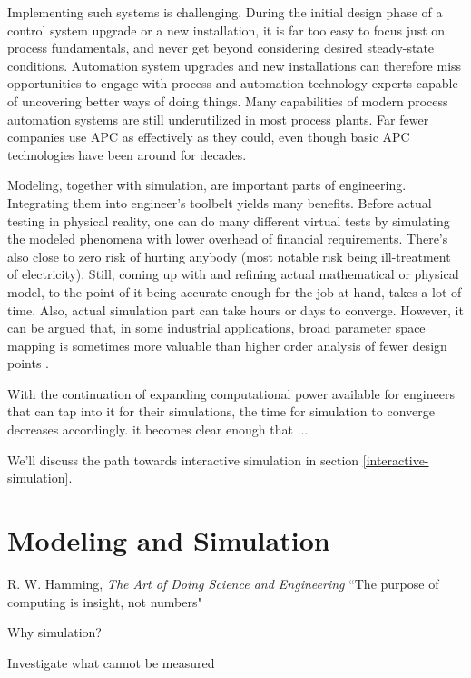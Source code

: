 Implementing such systems is challenging. During the initial design phase of a control system upgrade or a new installation, it is far too easy to focus just on process fundamentals, and never get beyond considering desired steady-state conditions. Automation system upgrades and new installations can therefore miss opportunities to engage with process and automation technology experts capable of uncovering better ways of doing things. Many capabilities of modern process automation systems are still underutilized in most process plants. Far fewer companies use APC as effectively as they could, even though basic APC technologies have been around for decades.

Modeling, together with simulation, are important parts of engineering. Integrating them into engineer's toolbelt yields many benefits. Before actual testing in physical reality, one can do many different virtual tests by simulating the modeled phenomena with lower overhead of financial requirements. There's also close to zero risk of hurting anybody (most notable risk being ill-treatment of electricity). Still, coming up with and refining actual mathematical or physical model, to the point of it being accurate enough for the job at hand, takes a lot of time. Also, actual simulation part can take hours or days to converge. However, it can be argued that, in some industrial applications, broad parameter space mapping is sometimes more valuable than higher order analysis of fewer design points \citep{harwoodREALTIMEMODELLINGSIMULATION}.

With the continuation of expanding computational power available for engineers that can tap into it for their simulations, the time for simulation to converge decreases accordingly. it becomes clear enough that ...

We'll discuss the path towards interactive simulation in section \ref{interactive-simulation}.


\section{Modeling and Simulation}

\begin{chapquote}{R. W. Hamming, \textit{The Art of Doing Science and Engineering}}
``The purpose of computing is insight, not numbers"
\end{chapquote}

Why simulation?

Investigate what cannot be measured

